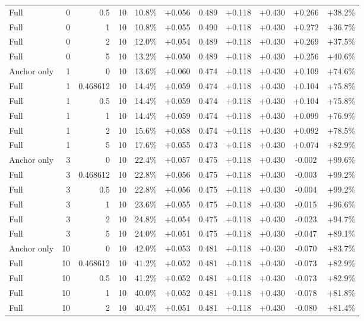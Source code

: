 \begin{table}[htbp]
\begin{tabular}{lrrrccccccc}
Full & 0 & 0.5 & 10 & 10.8\% & +0.056 & 0.489 & +0.118 & +0.430 & +0.266 & +38.2\% \\
Full & 0 & 1 & 10 & 10.8\% & +0.055 & 0.490 & +0.118 & +0.430 & +0.272 & +36.7\% \\
Full & 0 & 2 & 10 & 12.0\% & +0.054 & 0.489 & +0.118 & +0.430 & +0.269 & +37.5\% \\
Full & 0 & 5 & 10 & 13.2\% & +0.050 & 0.489 & +0.118 & +0.430 & +0.256 & +40.6\% \\
Anchor only & 1 & 0 & 10 & 13.6\% & +0.060 & 0.474 & +0.118 & +0.430 & +0.109 & +74.6\% \\
Full & 1 & 0.468612 & 10 & 14.4\% & +0.059 & 0.474 & +0.118 & +0.430 & +0.104 & +75.8\% \\
Full & 1 & 0.5 & 10 & 14.4\% & +0.059 & 0.474 & +0.118 & +0.430 & +0.104 & +75.8\% \\
Full & 1 & 1 & 10 & 14.4\% & +0.059 & 0.474 & +0.118 & +0.430 & +0.099 & +76.9\% \\
Full & 1 & 2 & 10 & 15.6\% & +0.058 & 0.474 & +0.118 & +0.430 & +0.092 & +78.5\% \\
Full & 1 & 5 & 10 & 17.6\% & +0.055 & 0.473 & +0.118 & +0.430 & +0.074 & +82.9\% \\
Anchor only & 3 & 0 & 10 & 22.4\% & +0.057 & 0.475 & +0.118 & +0.430 & -0.002 & +99.6\% \\
Full & 3 & 0.468612 & 10 & 22.8\% & +0.056 & 0.475 & +0.118 & +0.430 & -0.003 & +99.2\% \\
Full & 3 & 0.5 & 10 & 22.8\% & +0.056 & 0.475 & +0.118 & +0.430 & -0.004 & +99.2\% \\
Full & 3 & 1 & 10 & 23.6\% & +0.055 & 0.475 & +0.118 & +0.430 & -0.015 & +96.6\% \\
Full & 3 & 2 & 10 & 24.8\% & +0.054 & 0.475 & +0.118 & +0.430 & -0.023 & +94.7\% \\
Full & 3 & 5 & 10 & 24.0\% & +0.051 & 0.475 & +0.118 & +0.430 & -0.047 & +89.1\% \\
Anchor only & 10 & 0 & 10 & 42.0\% & +0.053 & 0.481 & +0.118 & +0.430 & -0.070 & +83.7\% \\
Full & 10 & 0.468612 & 10 & 41.2\% & +0.052 & 0.481 & +0.118 & +0.430 & -0.073 & +82.9\% \\
Full & 10 & 0.5 & 10 & 41.2\% & +0.052 & 0.481 & +0.118 & +0.430 & -0.073 & +82.9\% \\
Full & 10 & 1 & 10 & 40.0\% & +0.052 & 0.481 & +0.118 & +0.430 & -0.078 & +81.8\% \\
Full & 10 & 2 & 10 & 40.4\% & +0.051 & 0.481 & +0.118 & +0.430 & -0.080 & +81.4\% \\

\end{tabular}
\end{table}

